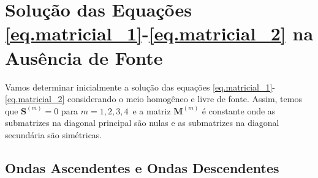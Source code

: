 \chapter{Solu\c{c}\~ao das Equa\c{c}\~oes \ref{eq.matricial_1}-\ref{eq.matricial_2} na Aus\^encia de Fonte}

Vamos determinar inicialmente a solu\c{c}\~ao das equa\c{c}\~oes \ref{eq.matricial_1}-\ref{eq.matricial_2} considerando o meio homog\^eneo e livre de fonte. Assim, temos que $\mathbf{S}^{(m)}=0$ para $m=1,2,3,4\,$ e a matriz $\mathbf{M}^{(m)}$ \'e constante onde as submatrizes na diagonal principal s\~ao nulas e as submatrizes na diagonal secund\'aria s\~ao sim\'etricas. 

\section{Ondas Ascendentes e Ondas Descendentes}

